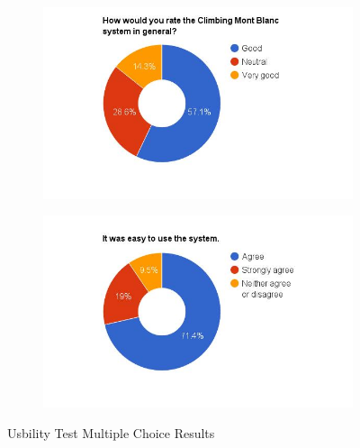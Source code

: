 \begin{figure}
    \hspace*{-1.5cm}
    \begin{subfigure}[h]{0.5\textwidth}
        \includegraphics[width=1.5\textwidth, height=1.0\textwidth]{results/general_cmb.jpg}
        \caption{}
        \label{fig:cmb-general}
    \end{subfigure}
    \hfill
    \begin{subfigure}[h]{0.5\textwidth}
        \includegraphics[width=1.5\textwidth, height=1.0\textwidth]{results/easy_to_use.jpg}
        \caption{}
        \label{fig:cmb-easy-use}
    \end{subfigure}
    \caption{Usbility Test Multiple Choice Results}
    \label{fig:multiplechoice}
\end{figure}


